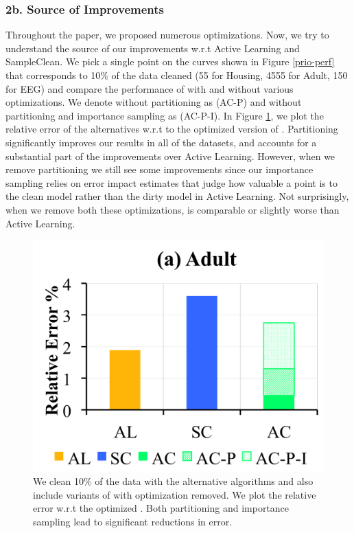 \subsubsection{2b. Source of Improvements}
Throughout the paper, we proposed numerous optimizations.
Now, we try to understand the source of our improvements w.r.t Active Learning and SampleClean.
We pick a single point on the curves shown in Figure \ref{prio-perf} that corresponds to 10\% of the data cleaned (55 for Housing, 4555 for Adult, 150 for EEG) and compare the performance of \sys with and without various optimizations.
We denote \sys without partitioning as (AC-P) and \sys without partitioning and importance sampling as (AC-P-I).
In Figure \ref{opts}, we plot the relative error of the alternatives w.r.t to the optimized version of \sys.
Partitioning significantly improves our results in all of the datasets, and accounts for a substantial part of the improvements over Active Learning.
However, when we remove partitioning we still see some improvements since our importance sampling relies on error impact estimates that judge how valuable a point is to the clean model rather than the dirty model in Active Learning.
Not surprisingly, when we remove both these optimizations, \sys is comparable or slightly worse than Active Learning.

\begin{figure}[ht!]
\centering
 \includegraphics[width=\columnwidth]{exp/exp8.png}
 \caption{We clean 10\% of the data with the alternative algorithms and also include variants of \sys with optimization removed. We plot the relative error w.r.t the optimized \sys. Both partitioning and importance sampling lead to significant reductions in error. \label{opts}}
\end{figure}


